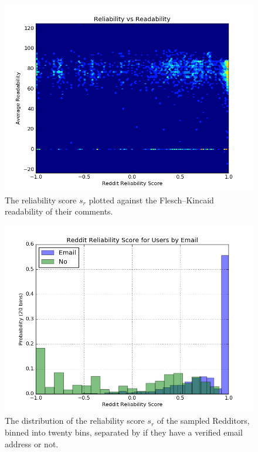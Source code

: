 \begin{figure}[tb]
    \centering
    \includegraphics[width=\linewidth]{figures/reliability_readability.png}
    \caption{The reliability score $s_r$ plotted against the Flesch--Kincaid readability of their comments.}
    \label{fig:reliability_readability}
\end{figure}

\begin{figure}[tb]
    \centering
    \includegraphics[width=\linewidth]{figures/data_20_email.png}
    \caption{The distribution of the reliability score $s_r$ of the sampled Redditors, binned into twenty bins, separated by if they have a verified email address or not.}
    \label{fig:data_20_email}
\end{figure}
